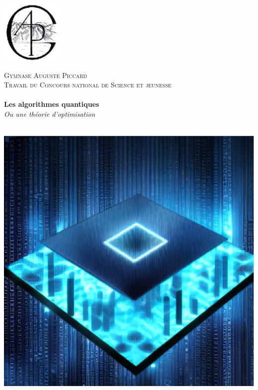
\begin{titlepage}
  \begin{sffamily}
  \begin{center}

    \includegraphics[width=3cm]{images/page-de-garde/gap.eps}

    \textsc{\LARGE Gymnase Auguste Piccard}\\[0.5cm]

    \textsc{\Large Travail du Concours national de Science et jeunesse}\\[1cm]

    \HRule \\[0.4cm]
    { \huge \textbf{Les algorithmes quantiques} \\ \textit{Ou une théorie d'optimisation} \\[0.4cm] }

    \HRule \\[1cm]
    \includegraphics[scale=0.5]{images/page-de-garde/sd5.eps}
    \\[1cm]


\end{center}
\end{sffamily}
\end{titlepage}
